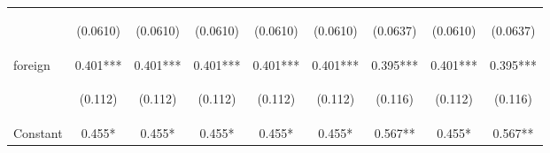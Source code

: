 \begin{center}
\begin{tabular}{lcccccccc}
\vspace{4pt} & \begin{footnotesize}(0.0610)\end{footnotesize} & \begin{footnotesize}(0.0610)\end{footnotesize} & \begin{footnotesize}(0.0610)\end{footnotesize} & \begin{footnotesize}(0.0610)\end{footnotesize} & \begin{footnotesize}(0.0610)\end{footnotesize} & \begin{footnotesize}(0.0637)\end{footnotesize} & \begin{footnotesize}(0.0610)\end{footnotesize} & \begin{footnotesize}(0.0637)\end{footnotesize} \\
foreign & 0.401*** & 0.401*** & 0.401*** & 0.401*** & 0.401*** & 0.395*** & 0.401*** & 0.395*** \\
\vspace{4pt} & \begin{footnotesize}(0.112)\end{footnotesize} & \begin{footnotesize}(0.112)\end{footnotesize} & \begin{footnotesize}(0.112)\end{footnotesize} & \begin{footnotesize}(0.112)\end{footnotesize} & \begin{footnotesize}(0.112)\end{footnotesize} & \begin{footnotesize}(0.116)\end{footnotesize} & \begin{footnotesize}(0.112)\end{footnotesize} & \begin{footnotesize}(0.116)\end{footnotesize} \\
Constant & 0.455* & 0.455* & 0.455* & 0.455* & 0.455* & 0.567** & 0.455* & 0.567** \\

\end{tabular}
\end{center}
